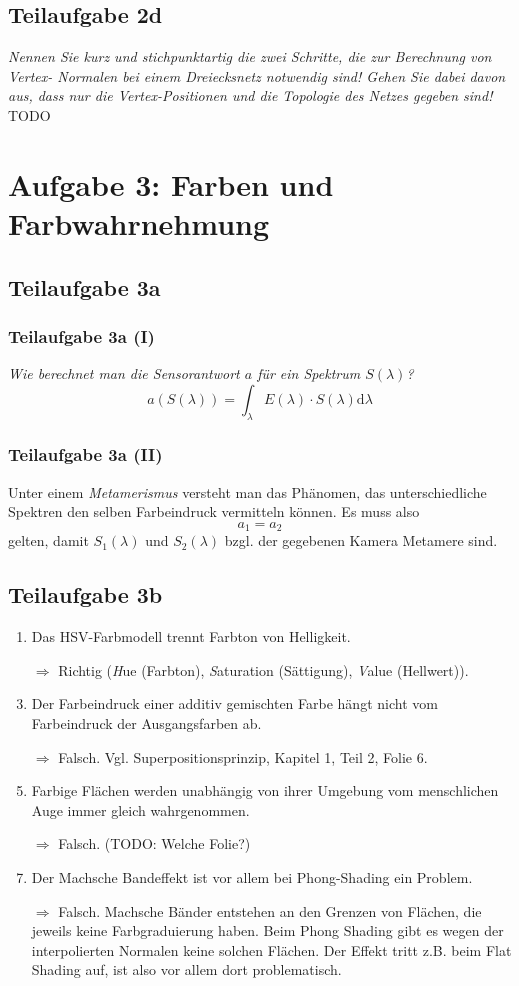 \documentclass[a4paper]{scrartcl}
\begin{document}
\subsection*{Teilaufgabe 2d}
\textit{Nennen Sie kurz und stichpunktartig die zwei Schritte, die zur Berechnung von Vertex-
Normalen bei einem Dreiecksnetz notwendig sind! Gehen Sie dabei davon aus, dass nur
die Vertex-Positionen und die Topologie des Netzes gegeben sind!}
TODO

\clearpage
\section*{Aufgabe 3: Farben und Farbwahrnehmung}
\subsection*{Teilaufgabe 3a}
\subsubsection*{Teilaufgabe 3a (I)}
\textit{Wie berechnet man die Sensorantwort $a$ für ein Spektrum $S(\lambda)$?}
\[a(S(\lambda)) = \int_\lambda E(\lambda) \cdot S(\lambda) \mathrm{d} \lambda \]

\subsubsection*{Teilaufgabe 3a (II)}
Unter einem \textit{Metamerismus} versteht man das Phänomen, das
unterschiedliche Spektren den selben Farbeindruck vermitteln können. Es muss
also
\[a_1 = a_2\]
gelten, damit $S_1(\lambda)$ und $S_2(\lambda)$ bzgl. der gegebenen Kamera
Metamere sind.

\subsection*{Teilaufgabe 3b}
\begin{enumerate}
    \item Das HSV-Farbmodell trennt Farbton von Helligkeit.
    \item[$\Rightarrow$] Richtig (\textit{H}ue (Farbton), \textit{S}aturation (Sättigung),
                         \textit{V}alue (Hellwert)).
    \item Der Farbeindruck einer additiv gemischten Farbe hängt nicht vom Farbeindruck der Ausgangsfarben ab.
    \item[$\Rightarrow$] Falsch. Vgl. Superpositionsprinzip, Kapitel 1, Teil 2, Folie 6.
    \item Farbige Flächen werden unabhängig von ihrer Umgebung vom menschlichen Auge immer gleich wahrgenommen.
    \item[$\Rightarrow$] Falsch. (TODO: Welche Folie?)
    \item Der Machsche Bandeffekt ist vor allem bei Phong-Shading ein Problem.
    \item[$\Rightarrow$] Falsch. Machsche Bänder entstehen an den Grenzen von Flächen, die jeweils keine Farbgraduierung haben. Beim Phong Shading gibt es wegen der interpolierten Normalen keine solchen Flächen. Der Effekt tritt z.B. beim Flat Shading auf, ist also vor allem dort problematisch. 
\end{enumerate}
\end{document}
